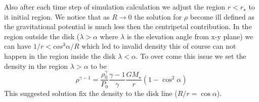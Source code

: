 \documentclass[12pt, a4paper]{article}
\begin{document}
Also after each time step of simulation calculation we adjust the region $r<r_\star$ to it initial region. 
We notice that as $R\rightarrow0$ the solution for $\rho$ become ill defined as the gravitational potential is much less then the centripetal contribution.
In the region outside the disk ($\lambda>\alpha$ where $\lambda$ is the elevation angle from x-y plane) we can have $1/r < cos^3\alpha/R $ which led to invalid density this of course can not happen in the region inside the disk $\lambda<\alpha$.
To over come this issue we set the density in the region $\lambda>\alpha$ to be 
\begin{equation}\label{eq:rho_outside_disk}
    \rho^{\gamma-1}=\frac{\rho_0^\gamma}{P_0}\frac{\gamma-1}{\gamma} \frac{G M_\star}{r} \left( 1 - \cos^2\alpha \right)
\end{equation}
This suggested solution fix the density to the disk line ($R/r=\cos\alpha$).
\end{document}
